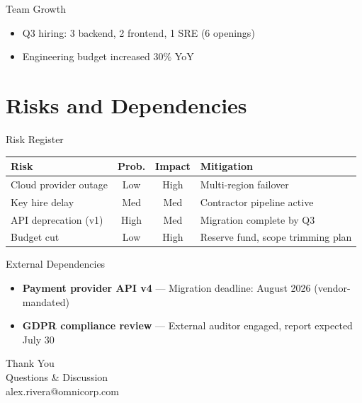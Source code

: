 \documentclass[
  doctype=beamer,
  beameraspectratio=169,
  beamertheme=Berlin,
  institution=generic,
]{omnilatex}
\begin{document}
\begin{frame}{Team Growth}
  \begin{center}
  \end{center}

  \begin{itemize}
    \item Q3 hiring: 3 backend, 2 frontend, 1 SRE (6 openings)
    \item Engineering budget increased 30\% YoY
  \end{itemize}
\end{frame}

\section{Risks and Dependencies}

\begin{frame}{Risk Register}
  \begin{table}
    \centering
    \begin{tabular}{l c c l}
      \hline
      Risk & Prob. & Impact & Mitigation \\
      \hline
      Cloud provider outage & Low & High & Multi-region failover \\
      Key hire delay & Med & Med & Contractor pipeline active \\
      API deprecation (v1) & High & Med & Migration complete by Q3 \\
      Budget cut & Low & High & Reserve fund, scope trimming plan \\
      \hline
    \end{tabular}
  \end{table}

  \vspace{1em}
  \begin{block}{External Dependencies}
    \begin{itemize}
      \item \textbf{Payment provider API v4} --- Migration deadline: August 2026 (vendor-mandated)
      \item \textbf{GDPR compliance review} --- External auditor engaged, report expected July 30
    \end{itemize}
  \end{block}
\end{frame}

\begin{frame}[plain,c]
  \vspace{1.5cm}
  {\huge Thank You}\\[0.8cm]
  {\large Questions \& Discussion}\\[1.5cm]
  {\footnotesize alex.rivera@omnicorp.com}
\end{frame}
\end{document}
